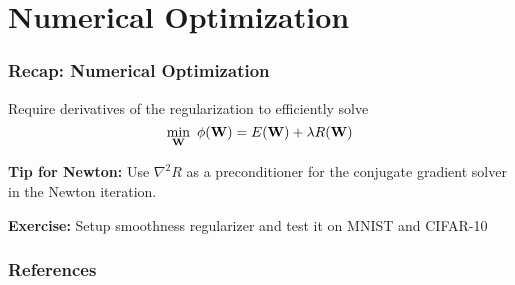 \documentclass[12pt,fleqn,handout]{beamer}
\begin{document}
\section{Numerical Optimization} %
\label{sec:numerical_optimization}
\begin{frame}[fragile]\frametitle{Recap: Numerical Optimization}

Require derivatives of the regularization to efficiently solve
$$ \min_{{\bf W}} \ \phi({\bf W}) = E({\bf W}) + \lambda R({\bf W}) $$


\bigskip
\pause

{\bf Tip for Newton:} Use $\nabla^2 R$ as a preconditioner for the conjugate gradient
solver in the Newton iteration. 

\bigskip
\pause
\textbf{Exercise:} Setup smoothness regularizer and test it on MNIST and CIFAR-10
\end{frame}



\begin{frame}[allowframebreaks]
	\frametitle{References}



\end{frame}
\end{document}
